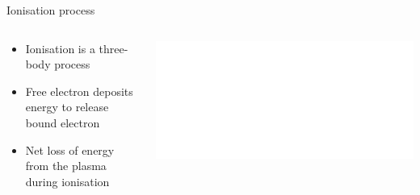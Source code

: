 \documentclass[10pt,aspectratio=169,usenames,dvipsnames]{beamer}
\begin{document}
\begin{frame}{Ionisation process}
\begin{columns}
\begin{column}{0.4\textwidth}
\begin{itemize}
    \item Ionisation is a three-body process
    \item Free electron deposits energy to release bound electron
    \item Net loss of energy from the plasma during ionisation
\end{itemize}
\end{column}
\begin{column}{0.6\textwidth}
\includegraphics[width=0.95\linewidth]{2023DundeeInterview/Figures/hydrogensketchion_inv.png} 
\end{column}
\end{columns}
\end{frame}
\end{document}
